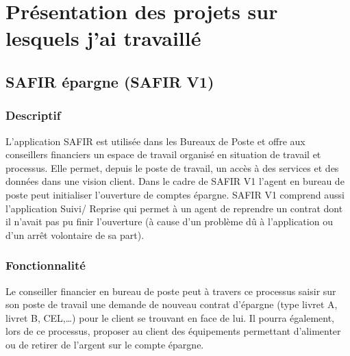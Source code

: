 \chapter{Présentation des projets sur lesquels j'ai travaillé}

\section{SAFIR épargne (SAFIR V1)}

\subsection{Descriptif}
L'application SAFIR est utilisée dans les Bureaux de Poste et offre aux conseillers financiers un espace de travail organisé en situation de travail et processus. Elle permet, depuis le poste de travail, un accès à des services et des données dans une vision client. Dans le cadre de SAFIR V1 l'agent en bureau de poste peut initialiser l'ouverture de comptes épargne. 
SAFIR V1 comprend aussi l'application Suivi/ Reprise qui permet à un agent de reprendre un contrat dont il n'avait pas pu finir l'ouverture (à cause d'un problème dû à l'application ou d'un arrêt volontaire de sa part).

\subsection{Fonctionnalité}
Le conseiller financier en bureau de poste peut à travers ce processus saisir sur son poste de travail une demande de nouveau contrat d’épargne (type livret A, livret B, CEL,…) pour le client se trouvant en face de lui. Il pourra également, lors de ce processus, proposer au client des équipements permettant d'alimenter ou de retirer de l'argent sur le compte épargne.

